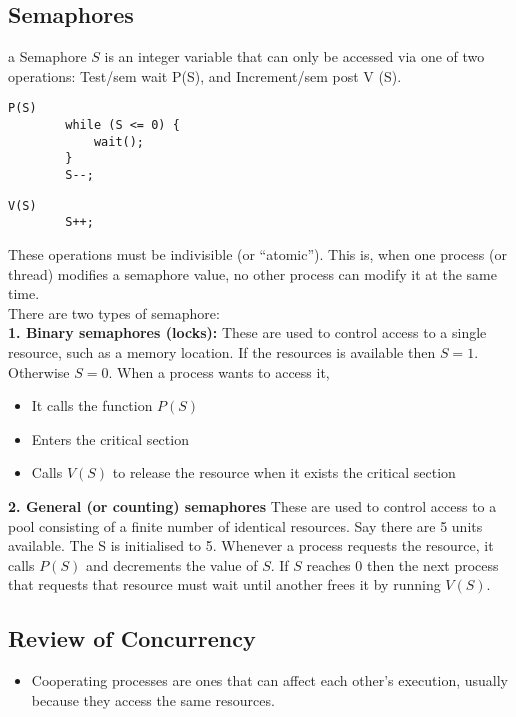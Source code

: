 \documentclass[a4paper, 10pt]{article}
\begin{document}
\subsection{Semaphores}
a Semaphore $S$ is an integer variable that can only be accessed via one of two operations: Test/sem wait P(S), and Increment/sem post V (S). \\
\begin{minipage}{0.48\textwidth}
    \begin{lstlisting}[style=CStyle, caption={Test or Sem\_wait}]
        P(S)
        while (S <= 0) {
            wait();
        }
        S--; 
    \end{lstlisting}
\end{minipage}
\begin{minipage}{0.48\textwidth}
    \begin{lstlisting}[style=CStyle, caption={Test/Sem\_wait}]
        V(S)
        S++; 
    \end{lstlisting}
\end{minipage}
These operations must be indivisible (or “atomic”). This is, when one process (or thread) modifies a semaphore value, no other process can modify it at the same time.\\[2ex]
There are two types of semaphore: \\
\textbf{1. Binary semaphores (locks):} These are used to control access to a single resource, such as a memory location. If the resources is available then $S = 1$. Otherwise $S = 0$. When a process wants to access it,
\begin{itemize}
    \item It calls the function $P(S)$
    \item Enters the critical section
    \item Calls $V(S)$ to release the resource when it exists the critical section
\end{itemize}
\textbf{2. General (or counting) semaphores}
These are used to control access to a pool consisting of a finite number of identical resources. Say there are 5 units available. The S is initialised to 5. Whenever a process requests the resource, it calls $P(S)$ and decrements the value of $S$. If $S$ reaches $0$ then the next process that requests that resource must wait until another frees it by running $V(S)$.
\subsection{Review of Concurrency}
\begin{itemize}
    \item Cooperating processes are ones that can affect each other's execution, usually because they access the same resources.
\end{itemize}
\end{document}
